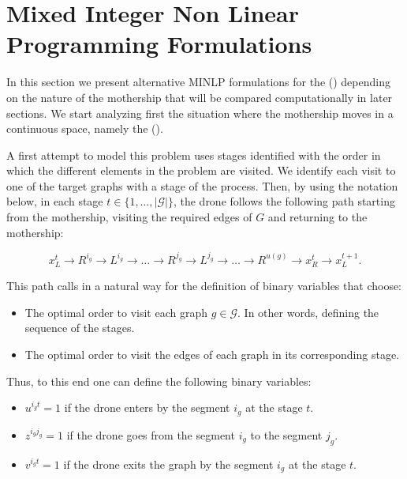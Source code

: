 \section{Mixed Integer Non Linear Programming Formulations}
In this section we present alternative MINLP formulations for the (\MDR) depending on the nature of  the mothership  that will be compared computationally in later sections. We start analyzing first the situation where the mothership moves in a continuous space, namely the (\AMD). 

A first attempt to model this problem uses stages identified with the order in which the different elements in the problem are visited. We identify each visit to one of the target graphs with a stage of the process. Then, by using the notation below, in each stage $t\in \{1,\ldots,|\mathcal G|\}$, the drone follows the following path starting from the mothership, visiting the required edges of $G$ and returning to the mothership:

$$
x_L^t\rightarrow R^{i_g}\rightarrow L^{i_g}\rightarrow\ldots\rightarrow R^{j_g}\rightarrow L^{j_g}\rightarrow \ldots \rightarrow R^{u(g)} \rightarrow x_R^t\rightarrow x_L^{t+1}.
$$

This path calls in a natural way for the definition of binary variables that choose:
\begin{itemize}
    \item The optimal order to visit each graph $g\in\mathcal G$. In other words, defining the sequence of the stages.
    \item The optimal order to visit the edges of each graph in its corresponding stage.
\end{itemize}

Thus, to this end one can define the following binary variables:
\begin{itemize}
    \item $u^{i_gt} = 1$ if the drone enters by the segment $i_g$ at the stage $t$.
    \item $z^{i_gj_g} = 1$ if the drone goes from the segment $i_g$ to the segment $j_g$.
    \item $v^{i_gt} = 1$ if the drone exits the graph by the segment $i_g$ at the stage $t$.
\end{itemize}

